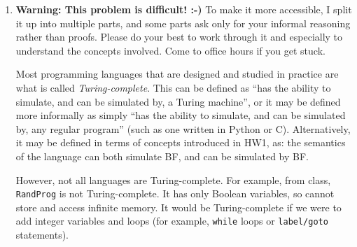 \documentclass{article}
\theoremstyle{plain}
\begin{document}
\begin{enumerate}
For this problem, write two functions:
\begin{verbatim}
pub fn num_basic_blocks(bf_prog: &str) -> usize
\end{verbatim}

which takes a BF program as a plain ASCII string and calculates the number of basic blocks; and

\begin{verbatim}
pub fn num_edges(bf_prog: &str) -> usize
\end{verbatim}

which takes a BF program as a plain ASCII string and calculates the number of edges.
Both functions may assume the BF program is valid (has matching loop instructions)
It may be the empty string.

You do not need to actually write a compiler which takes the BF program and calculates its control flow graph as an intermediate representation as part of this problem, though you may choose to do so.
We will grade only your two functions for correctness.

You may want to write some unit tests for your functions to ensure they are working correctly.


\item
\textbf{Warning: This problem is difficult! :-)}
To make it more accessible,
I split it up into multiple parts, and
some parts ask only for your informal reasoning rather than proofs.
Please do your best to work through it and especially to understand the concepts involved.
Come to office hours if you get stuck.

Most programming languages that are designed and studied in practice are what is called \emph{Turing-complete}.
This can be defined as ``has the ability to simulate, and can be simulated by, a Turing machine'', or it may be defined more informally as simply ``has the ability to simulate, and can be simulated by, any regular program'' (such as one written in Python or C).
Alternatively, it may be defined in terms of concepts introduced in HW1, as:
the semantics of the language can both simulate BF, and can be simulated by BF.

However, not all languages are Turing-complete.
For example, from class, \texttt{RandProg} is not Turing-complete. It has only Boolean variables, so cannot store and access infinite memory. It would be Turing-complete if we were to add integer variables and loops (for example, \texttt{while} loops or \texttt{label/goto} statements).


\end{enumerate}
\end{document}
